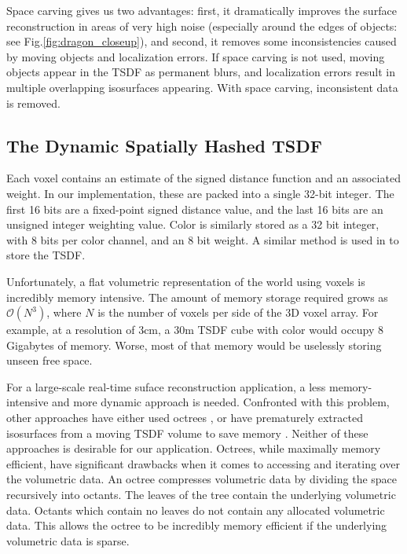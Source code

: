 \documentclass[10pt,twocolumn,letterpaper]{article}
\newcommand{\figref}[1]{Fig.\ref{#1}}
\begin{document}
Space carving gives us two advantages: first, it dramatically improves the
surface reconstruction in areas of very high noise (especially around the edges
of objects: see \figref{fig:dragon_closeup}), and second, it removes
some inconsistencies caused by moving objects and localization errors. If space
carving is not used, moving objects appear in the TSDF as permanent blurs, and
localization errors result in multiple overlapping isosurfaces appearing. With
space carving, inconsistent data is removed.

\subsection{The Dynamic Spatially Hashed TSDF}
\label{section:spatialhash}
Each voxel contains an estimate of the signed distance function and an
associated weight. In our implementation, these are packed into a single 32-bit
integer. The first 16 bits are a fixed-point signed distance value, and the
last 16 bits  are an unsigned integer weighting value. Color is similarly
stored as a 32 bit integer, with 8 bits per color channel, and an 8 bit weight.
A similar method is used in \cite{Newcombe, Whelan2013, Bylow2013} to store the
TSDF.

Unfortunately, a flat volumetric representation of the world using voxels is
incredibly memory intensive. The amount of memory storage required grows as
$\mathcal{O}(N^3)$, where $N$ is the number of voxels per side of the 3D voxel
array. For example, at a resolution of $3\text{cm}$,  a $30\text{m}$ TSDF cube
with color would occupy 8 Gigabytes of memory. Worse, most of that memory would be
uselessly storing unseen free space.

For a large-scale real-time suface reconstruction application, a less
memory-intensive and more dynamic approach is needed. Confronted with this
problem, other approaches have either used  octrees \cite{Wurm2010}, or have
prematurely extracted isosurfaces from a moving TSDF volume to save memory
\cite{Whelan2013}. Neither of these approaches is desirable for our application.
Octrees, while maximally memory efficient, have significant drawbacks when it comes to
accessing and iterating over the volumetric data. An octree compresses
volumetric data by dividing the space recursively into octants. The leaves of
the tree contain the underlying volumetric data. Octants which contain no
leaves do not contain any allocated volumetric data. This allows the octree to
be incredibly memory efficient if the underlying volumetric data is sparse.
\end{document}
